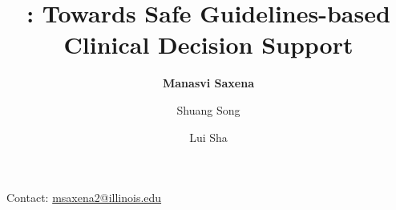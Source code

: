 \documentclass{beamer}
\title[]{\MediK{}: Towards Safe Guidelines-based Clinical Decision Support}
\author[]{\textbf{Manasvi Saxena} \and Shuang Song \and Lui Sha}
\institute[]{University of Illinois at Urbana Champaign}
\date{}
\begin{document}
\begin{frame}
  \vfill
  \titlepage
  \vfill
   Contact: \url{msaxena2@illinois.edu}
\end{frame}
\end{document}
